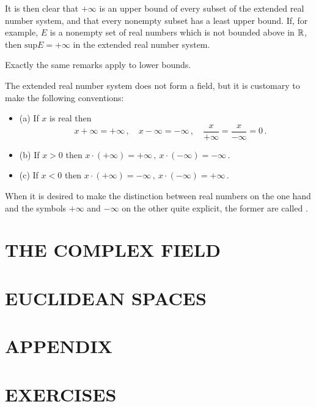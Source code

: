 It is then clear that $+ \infty$ is an upper bound of every subset of the extended real number system, and that every nonempty subset has a least upper bound. If, for example, $E$ is a nonempty set of real numbers which is not bounded above in $\mathbb{R}$, 
then $\text{sup} E = + \infty$ in the extended real number system.

Exactly the same remarks apply to lower bounds. 

The extended real number system does not form a field, but it is customary to make the following conventions:

\begin{itemize}
\item[] (a) If $x$ is real then 
$$\quad x + \infty = + \infty\,, \quad x - \infty = - \infty\,,\quad \frac{x}{+ \infty} = \frac{x}{- \infty} = 0\,.$$ 
\item[] (b) If $x > 0$ then $x \cdot (+ \infty) = + \infty\,,\: x \cdot (- \infty) = - \infty\,. $  
\item[] (c) If $x < 0$ then $x \cdot (+ \infty) = - \infty\,,\: x \cdot (- \infty) = + \infty\,. $  
\end{itemize}        

When it is desired to make the distinction between real numbers on the one hand and the symbols $+ \infty$ and $- \infty$ on the other quite explicit, the former are called .  

\section*{THE COMPLEX FIELD}


\section*{EUCLIDEAN SPACES}


\section*{APPENDIX}


\section*{EXERCISES}






